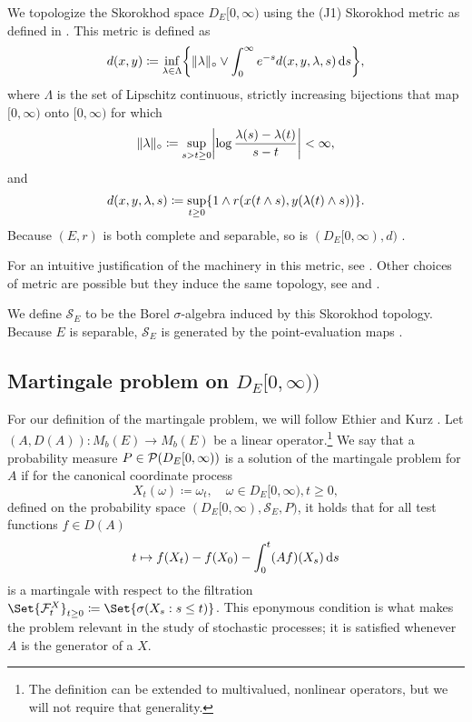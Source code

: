 We topologize the Skorokhod space $D_E[0,\infty)$ using the (J1) Skorokhod metric as defined in \cite[pp.116-117]{ethier_markov_1985}.
This metric is defined as
\begin{equation}
    d(x,y) \coloneqq \inf_{\lambda \in \Lambda} \cbr*{ \norm{\lambda}_\circ \lor \int_0^\infty e^{-s} d(x,y,\lambda,s) \odif{s} },
\end{equation}
where $\Lambda$ is the set of Lipschitz continuous, strictly increasing bijections that map $[0,\infty)$ onto $[0,\infty)$ for which
\begin{equation}
    \norm{\lambda}_\circ \coloneqq \sup_{s > t \geq 0} \abs*{ \log \frac{\lambda(s)-\lambda(t)}{s-t} } < \infty,
\end{equation}
and
\begin{equation}
    d(x,y,\lambda,s) \coloneqq \sup_{t \geq 0} \{ 1 \land r(x(t \land s), y(\lambda(t) \land s)) \}.
\end{equation}
Because $(E, r)$ is both complete and separable, so is $(D_E[0,\infty), d)$ \cite[Theorem 3.5.6]{ethier_markov_1985}.

For an intuitive justification of the machinery in this metric, see \cite{kern_skorokhod_2024}.
Other choices of metric are possible but they induce the same topology, see \cite[pp.166-168]{billingsley_convergence_1999} and \cite[p.122-123]{pollard_convergence_1984}.

\medskip

We define $\mathscr{S}_{E}$ to be the Borel $\sigma$-algebra induced by this Skorokhod topology.
Because $E$ is separable, $\mathscr{S}_{E}$ is generated by the point-evaluation maps \cite[Proposition 3.7.1]{ethier_markov_1985}.


\subsection{Martingale problem on \texorpdfstring{$D_E[0,\infty))$}{D_E[0,infinity)}}\label{sec:martingale-problem}

For our definition of the martingale problem, we will follow Ethier and Kurz \cite[p.174]{ethier_markov_1985}.
Let $(A, D(A)) : M_b(E) \to M_b(E)$ be a linear operator.\footnote{The definition can be extended to multivalued, nonlinear operators, but we will not require that generality.}
We say that a probability measure $P \in \mathcal{P}(D_E[0,\infty))$ is a solution of the martingale problem for $A$ if for the canonical coordinate process
\begin{equation}
    X_t(\omega) \coloneqq \omega_t, \quad \omega \in D_E[0,\infty), t \geq 0,
\end{equation}
defined on the probability space $(D_E[0,\infty), \mathscr{S}_E, P)$, it holds that for all test functions $f \in D(A)$
\begin{equation}
    t \mapsto f(X_t) - f(X_0) - \int_0^t (Af)(X_s) \odif{s}
\end{equation}
is a martingale with respect to the filtration $\Set{\cF_t^X}_{t\geq0} \coloneqq \Set{\sigma(X_s : s \leq t)}$. %
This eponymous condition is what makes the problem relevant in the study of stochastic processes; it is satisfied whenever $A$ is the generator of a $X$.

